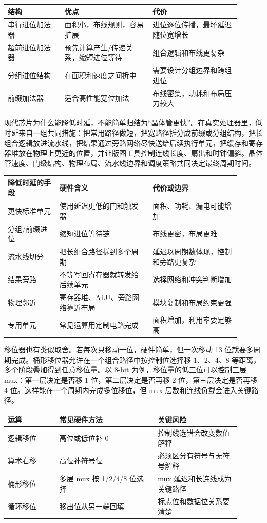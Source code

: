 \begin{longtable}{L{0.22\linewidth}L{0.34\linewidth}L{0.34\linewidth}}
\toprule
结构 & 优点 & 代价 \\
\midrule
串行进位加法器 & 面积小，布线规则，容易扩展 & 进位逐位传播，最坏延迟随位宽增长 \\
超前进位加法器 & 预先计算产生/传递关系，缩短进位等待 & 组合逻辑和布线更复杂 \\
分组进位结构 & 在面积和速度之间折中 & 需要设计分组边界和跨组进位 \\
前缀加法器 & 适合高性能宽位加法 & 布线密集，功耗和布局压力较大 \\
\bottomrule
\end{longtable}

现代芯片为什么能降低时延，不能简单归结为“晶体管更快”。在真实处理器里，低时延来自一组共同措施：把常用路径做短，把宽路径拆分成前缀或分组结构，把长组合逻辑放进流水线，把结果通过旁路网络尽快送给后续执行单元，把缓存和寄存器堆放在物理上更近的位置，并让版图工具控制连线长度、扇出和时钟偏斜。晶体管速度、门级结构、物理布局、流水线边界和调度策略共同决定最终周期时间。

\begin{longtable}{L{0.2\linewidth}L{0.36\linewidth}L{0.34\linewidth}}
\toprule
降低时延的手段 & 硬件含义 & 代价或边界 \\
\midrule
更快标准单元 & 使用延迟更低的门和触发器 & 面积、功耗、漏电可能增加 \\
分组/前缀进位 & 缩短进位等待链 & 布线更密，布局更难 \\
流水线切分 & 把长组合路径拆到多个周期 & 延迟以周期数体现，控制和旁路更复杂 \\
结果旁路 & 不等写回寄存器就转发给后续单元 & 选择网络和冲突判断增加 \\
物理邻近 & 寄存器堆、ALU、旁路网络靠近布局 & 模块复制和布局约束更强 \\
专用单元 & 常见运算用定制电路完成 & 面积增加，利用率要足够高 \\
\bottomrule
\end{longtable}

移位器也有类似取舍。若每次只移动一位，硬件简单，但一次移动 13 位就要多周期完成。桶形移位器允许在一个组合路径中按控制位选择移 1、2、4、8 等距离，多个阶段叠加得到任意移位量。以 8-bit 为例，移位量的低三位可以控制三层 mux：第一层决定是否移 1 位，第二层决定是否再移 2 位，第三层决定是否再移 4 位。这样能在一个周期内完成多位移位，但 mux 层数和连线负载会进入关键路径。

\begin{longtable}{L{0.2\linewidth}L{0.38\linewidth}L{0.32\linewidth}}
\toprule
运算 & 常见硬件方法 & 关键风险 \\
\midrule
逻辑移位 & 高位或低位补 0 & 控制线选错会改变数值解释 \\
算术右移 & 高位补符号位 & 必须区分有符号与无符号解释 \\
桶形移位 & 多层 mux 按 1/2/4/8 位选择 & mux 延迟和长连线成为关键路径 \\
循环移位 & 移出位从另一端回填 & 标志位和数据位关系要清楚 \\
\bottomrule
\end{longtable}

